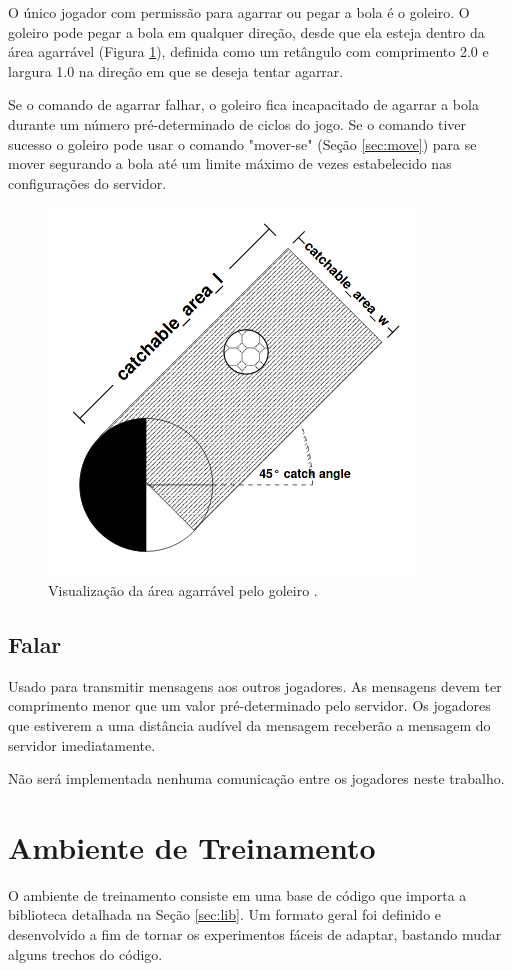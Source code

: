 O único jogador com permissão para agarrar ou pegar a bola é o goleiro. O goleiro pode pegar a bola em qualquer direção, desde que ela esteja dentro da área agarrável (Figura \ref{fig:catch}), definida como um retângulo com comprimento 2.0 e largura 1.0 na direção em que se deseja tentar agarrar.

Se o comando de agarrar falhar, o goleiro fica incapacitado de agarrar a bola durante um número pré-determinado de ciclos do jogo. Se o comando tiver sucesso o goleiro pode usar o comando "mover-se" (Seção \ref{sec:move}) para se mover segurando a bola até um limite máximo de vezes estabelecido nas configurações do servidor.

\begin{figure}[H]
	\includegraphics[width=0.5\linewidth]{figs/catch.png}
	\centering
	\caption{Visualização da área agarrável pelo goleiro \cite{rcssmanual2003}.}
	\label{fig:catch}
\end{figure}

\subsection{Falar}

Usado para transmitir mensagens aos outros jogadores. As mensagens devem ter comprimento menor que um valor pré-determinado pelo servidor. Os jogadores que estiverem a uma distância audível da mensagem receberão a mensagem do servidor imediatamente.

Não será implementada nenhuma comunicação entre os jogadores neste trabalho.


\section{Ambiente de Treinamento}

O ambiente de treinamento consiste em uma base de código que importa a biblioteca detalhada na Seção \ref{sec:lib}. Um formato geral foi definido e desenvolvido a fim de tornar os experimentos fáceis de adaptar, bastando mudar alguns trechos do código.

